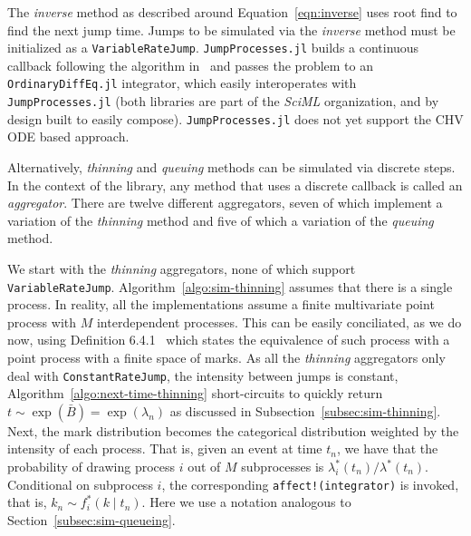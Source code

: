 \documentclass{juliacon}
\numberwithin{equation}{section}
\begin{document}
The \textit{inverse} method as described around Equation~\ref{eqn:inverse} uses root find to find the next jump time. Jumps to be simulated via the \textit{inverse} method must be initialized as a \texttt{VariableRateJump}. \texttt{JumpProcesses.jl} builds a continuous callback following the algorithm in~\cite{salis2005} and passes the problem to an \texttt{OrdinaryDiffEq.jl} integrator, which easily interoperates with \texttt{JumpProcesses.jl} (both libraries are part of the \textit{SciML} organization, and by design built to easily compose). \texttt{JumpProcesses.jl} does not yet support the CHV ODE based approach.

Alternatively, \textit{thinning} and \textit{queuing} methods can be simulated via discrete steps. In the context of the library, any method that uses a discrete callback is called an \textit{aggregator}. There are twelve different aggregators, seven of which implement a variation of the \textit{thinning} method and five of which a variation of the \textit{queuing} method.

We start with the \textit{thinning} aggregators, none of which support \texttt{VariableRateJump}. Algorithm~\ref{algo:sim-thinning} assumes that there is a single process. In reality, all the implementations assume a finite multivariate point process with \( M \) interdependent processes. This can be easily conciliated, as we do now, using Definition 6.4.1~\cite{daley2003} which states the equivalence of such process with a point process with a finite space of marks. As all the \textit{thinning} aggregators only deal with \texttt{ConstantRateJump}, the intensity between jumps is constant, Algorithm~\ref{algo:next-time-thinning} short-circuits to quickly return \( t \sim \exp(\bar{B}) = \exp(\lambda_n) \) as discussed in Subsection~\ref{subsec:sim-thinning}. Next, the mark distribution becomes the categorical distribution weighted by the intensity of each process. That is, given an event at time \( t_n \), we have that the probability of drawing process \( i \) out of \( M \) subprocesses is \( \lambda_i^\ast (t_n)  / \lambda^\ast (t_n) \). Conditional on subprocess \( i \), the corresponding \texttt{affect!(integrator)} is invoked, that is, \( k_n \sim f_i^\ast (k \mid t_n) \). Here we use a notation analogous to Section~\ref{subsec:sim-queueing}.
\end{document}
